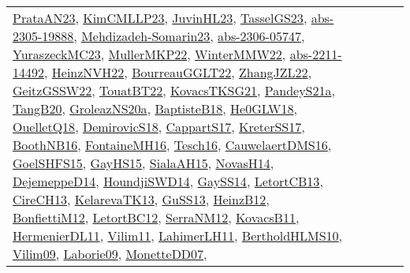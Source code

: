 {\begin{longtable}{lp{3cm}>{\raggedright}p{6cm}>{\raggedright}p{6cm}p{8cm}}
\href{articles/PrataAN23.pdf}{PrataAN23}\cite{PrataAN23}, \href{papers/KimCMLLP23.pdf}{KimCMLLP23}\cite{KimCMLLP23}, \href{papers/JuvinHL23.pdf}{JuvinHL23}\cite{JuvinHL23}, \href{papers/TasselGS23.pdf}{TasselGS23}\cite{TasselGS23}, \href{articles/abs-2305-19888.pdf}{abs-2305-19888}\cite{abs-2305-19888}, \href{papers/Mehdizadeh-Somarin23.pdf}{Mehdizadeh-Somarin23}\cite{Mehdizadeh-Somarin23}, \href{articles/abs-2306-05747.pdf}{abs-2306-05747}\cite{abs-2306-05747}, \href{papers/YuraszeckMC23.pdf}{YuraszeckMC23}\cite{YuraszeckMC23}, \href{articles/MullerMKP22.pdf}{MullerMKP22}\cite{MullerMKP22}, \href{papers/WinterMMW22.pdf}{WinterMMW22}\cite{WinterMMW22}, \href{articles/abs-2211-14492.pdf}{abs-2211-14492}\cite{abs-2211-14492}, \href{articles/HeinzNVH22.pdf}{HeinzNVH22}\cite{HeinzNVH22}, \href{articles/BourreauGGLT22.pdf}{BourreauGGLT22}\cite{BourreauGGLT22}, \href{papers/ZhangJZL22.pdf}{ZhangJZL22}\cite{ZhangJZL22}, \href{papers/GeitzGSSW22.pdf}{GeitzGSSW22}\cite{GeitzGSSW22}, \href{papers/TouatBT22.pdf}{TouatBT22}\cite{TouatBT22}, \href{papers/KovacsTKSG21.pdf}{KovacsTKSG21}\cite{KovacsTKSG21}, \href{articles/PandeyS21a.pdf}{PandeyS21a}\cite{PandeyS21a}, \href{papers/TangB20.pdf}{TangB20}\cite{TangB20}, \href{papers/GroleazNS20a.pdf}{GroleazNS20a}\cite{GroleazNS20a}, \href{articles/BaptisteB18.pdf}{BaptisteB18}\cite{BaptisteB18}, \href{papers/He0GLW18.pdf}{He0GLW18}\cite{He0GLW18}, \href{papers/OuelletQ18.pdf}{OuelletQ18}\cite{OuelletQ18}, \href{papers/DemirovicS18.pdf}{DemirovicS18}\cite{DemirovicS18}, \href{papers/CappartS17.pdf}{CappartS17}\cite{CappartS17}, \href{articles/KreterSS17.pdf}{KreterSS17}\cite{KreterSS17}, \href{papers/BoothNB16.pdf}{BoothNB16}\cite{BoothNB16}, \href{papers/FontaineMH16.pdf}{FontaineMH16}\cite{FontaineMH16}, \href{papers/Tesch16.pdf}{Tesch16}\cite{Tesch16}, \href{papers/CauwelaertDMS16.pdf}{CauwelaertDMS16}\cite{CauwelaertDMS16}, \href{articles/GoelSHFS15.pdf}{GoelSHFS15}\cite{GoelSHFS15}, \href{papers/GayHS15.pdf}{GayHS15}\cite{GayHS15}, \href{papers/SialaAH15.pdf}{SialaAH15}\cite{SialaAH15}, \href{articles/NovasH14.pdf}{NovasH14}\cite{NovasH14}, \href{papers/DejemeppeD14.pdf}{DejemeppeD14}\cite{DejemeppeD14}, \href{papers/HoundjiSWD14.pdf}{HoundjiSWD14}\cite{HoundjiSWD14}, \href{papers/GaySS14.pdf}{GaySS14}\cite{GaySS14}, \href{papers/LetortCB13.pdf}{LetortCB13}\cite{LetortCB13}, \href{papers/CireCH13.pdf}{CireCH13}\cite{CireCH13}, \href{papers/KelarevaTK13.pdf}{KelarevaTK13}\cite{KelarevaTK13}, \href{papers/GuSS13.pdf}{GuSS13}\cite{GuSS13}, \href{papers/HeinzB12.pdf}{HeinzB12}\cite{HeinzB12}, \href{papers/BonfiettiM12.pdf}{BonfiettiM12}\cite{BonfiettiM12}, \href{papers/LetortBC12.pdf}{LetortBC12}\cite{LetortBC12}, \href{papers/SerraNM12.pdf}{SerraNM12}\cite{SerraNM12}, \href{articles/KovacsB11.pdf}{KovacsB11}\cite{KovacsB11}, \href{papers/HermenierDL11.pdf}{HermenierDL11}\cite{HermenierDL11}, \href{papers/Vilim11.pdf}{Vilim11}\cite{Vilim11}, \href{papers/LahimerLH11.pdf}{LahimerLH11}\cite{LahimerLH11}, \href{papers/BertholdHLMS10.pdf}{BertholdHLMS10}\cite{BertholdHLMS10}, \href{papers/Vilim09.pdf}{Vilim09}\cite{Vilim09}, \href{papers/Laborie09.pdf}{Laborie09}\cite{Laborie09}, \href{papers/MonetteDD07.pdf}{MonetteDD07}\cite{MonetteDD07}, 
\end{longtable}}
